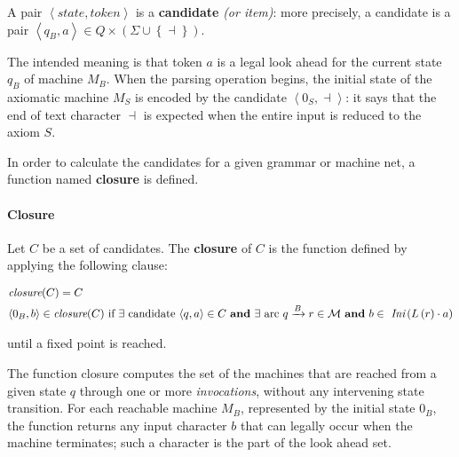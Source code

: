 \documentclass[english]{article}
\begin{document}
A pair \(\left\langle \textit{state}, \textit{token} \right\rangle\) is a \textbf{candidate} \textit{(or item)}:
more precisely, a candidate is a pair \(\left\langle q_B, a \right\rangle \in Q \times \left( \Sigma \cup \left\{ \dashv \right\} \right)\).

The intended meaning is that token \(a\) is a legal look ahead for the current state \(q_B\) of machine \(M_B\).
When the parsing operation begins, the initial state of the axiomatic machine \(M_S\) is encoded by the candidate \(\left\langle 0_S, \dashv \right\rangle\):
it says that the end of text character \(\dashv\) is expected when the entire input is reduced to the axiom \(S\).

In order to calculate the candidates for a given grammar or machine net, a function named \textbf{closure} is defined.

\paragraph{Closure}
\label{par:closure}

Let \(C\) be a set of candidates.
The \textbf{closure} of \(C\) is the function defined by applying the following clause:

\begin{gather*}
  \begin{aligned}
     & \textit{closure}(C) = C                                                                                                                                                                                                                                                 \\
     & \langle 0_B, b \rangle \in \textit{closure}(C) \ \text{if} \ \exists \ \text{candidate} \ \langle q,a \rangle \in C \ \textbf{and} \ \exists \ \text{arc} \  q\xrightarrow{B} r \in \mathcal{M} \ \textbf{and} \ b \in \ \Ini \left( L \left( r \right) \cdot a \right) \\
  \end{aligned}
\end{gather*}

until a fixed point is reached.

\bigskip
The function closure computes the set of the machines that are reached from a given state \(q\) through one or more \textit{invocations}, without any intervening state transition.
For each reachable machine \(M_B\), represented by the initial state \(0_B\), the function returns any input character \(b\) that can legally occur when the machine terminates;
such a character is the part of the look ahead set.
\end{document}
